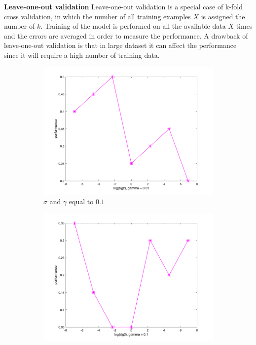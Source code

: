 \documentclass[a4paper, 11pt, one column]{article}
\begin{document}
\textbf{Leave-one-out validation}
Leave-one-out validation is a special case of k-fold cross validation, in which the number of all training examples $X$ is assigned the number of $k$. Training of the model is performed on all the available data $X$ times and the errors are averaged in order to measure the performance. A drawback of leave-one-out validation is that in large dataset it can affect the performance since it will require a high number of training data. 

\begin{figure}[]
        \begin{subfigure}{0.33\linewidth}
            \includegraphics[width=\linewidth]{images/rsplit_0.01.png}
            \caption{$\sigma$ and $\gamma$ equal to $0.1$}
        \end{subfigure}
        \begin{subfigure}{0.33\linewidth}
            \includegraphics[width=\linewidth]{images/rsplit_0.1.png}

\end{subfigure}
\end{figure}
\end{document}
